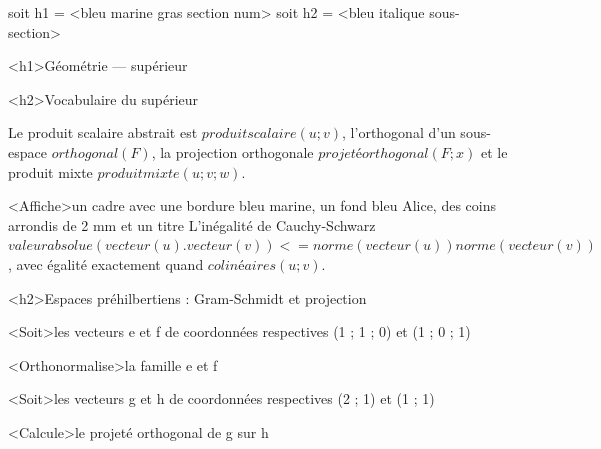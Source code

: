 \documentclass[marges=20, taille=11]{texecole}
\begin{document}
soit h1 = <bleu marine gras section num>
soit h2 = <bleu italique sous-section>

<h1>Géométrie — supérieur


<h2>Vocabulaire du supérieur

Le produit scalaire abstrait est $produit scalaire(u; v)$, l'orthogonal d'un sous-espace $orthogonal(F)$, la projection orthogonale
$projeté orthogonal(F; x)$ et le produit mixte $produit mixte(u; v; w)$.

<Affiche>un cadre avec une bordure bleu marine, un fond bleu Alice, des coins arrondis de 2 mm et un titre {L'inégalité de Cauchy-Schwarz} {
	$valeur absolue(vecteur(u) . vecteur(v)) <= norme(vecteur(u)) norme(vecteur(v))$,
	avec égalité exactement quand $colinéaires(u; v)$.
}

<h2>Espaces préhilbertiens : Gram-Schmidt et projection

<Soit>les vecteurs e et f de coordonnées respectives (1 ; 1 ; 0) et (1 ; 0 ; 1)

<Orthonormalise>la famille e et f

<Soit>les vecteurs g et h de coordonnées respectives (2 ; 1) et (1 ; 1)

<Calcule>le projeté orthogonal de g sur h
\end{document}
